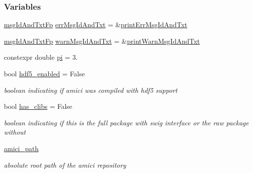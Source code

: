 \subsubsection*{Variables}
\begin{DoxyCompactItemize}
\item 
\mbox{\hyperlink{namespaceamici_a02384ab9af881494db3ed32cd6ecdcc0}{msg\+Id\+And\+Txt\+Fp}} \mbox{\hyperlink{namespaceamici_a19eefc037cc960b013cc0b724e5292b7}{err\+Msg\+Id\+And\+Txt}} = \&\mbox{\hyperlink{namespaceamici_ade28c6a7f1b5aee40bb2453fb61b4024}{print\+Err\+Msg\+Id\+And\+Txt}}
\item 
\mbox{\hyperlink{namespaceamici_a02384ab9af881494db3ed32cd6ecdcc0}{msg\+Id\+And\+Txt\+Fp}} \mbox{\hyperlink{namespaceamici_adb95b29229e987b4b0a55ade25961688}{warn\+Msg\+Id\+And\+Txt}} = \&\mbox{\hyperlink{namespaceamici_a14122f73594a970df27bfcb8fa0db35d}{print\+Warn\+Msg\+Id\+And\+Txt}}
\item 
constexpr double \mbox{\hyperlink{namespaceamici_ad172e8d1a294401209781f9aeaa77410}{pi}} = 3.
\item 
\mbox{\label{namespaceamici_a58c12f0767223d7b6e2de58a32cab341}} 
bool \mbox{\hyperlink{namespaceamici_a58c12f0767223d7b6e2de58a32cab341}{hdf5\+\_\+enabled}} = False
\begin{DoxyCompactList}\small\item\em boolean indicating if amici was compiled with hdf5 support \end{DoxyCompactList}\item 
\mbox{\label{namespaceamici_a986356865d3cca4610b14c4c7c383fcb}} 
bool \mbox{\hyperlink{namespaceamici_a986356865d3cca4610b14c4c7c383fcb}{has\+\_\+clibs}} = False
\begin{DoxyCompactList}\small\item\em boolean indicating if this is the full package with swig interface or the raw package without \end{DoxyCompactList}\item 
\mbox{\hyperlink{namespaceamici_a6b3f3dfe4601baaa0bf0a02b9a01a896}{amici\+\_\+path}}
\begin{DoxyCompactList}\small\item\em absolute root path of the amici repository \end{DoxyCompactList}\item 
\mbox{\label{namespaceamici_a1e71ffa8e12718e578ac6b974c5a6cd5}} 

\end{DoxyCompactItemize}
